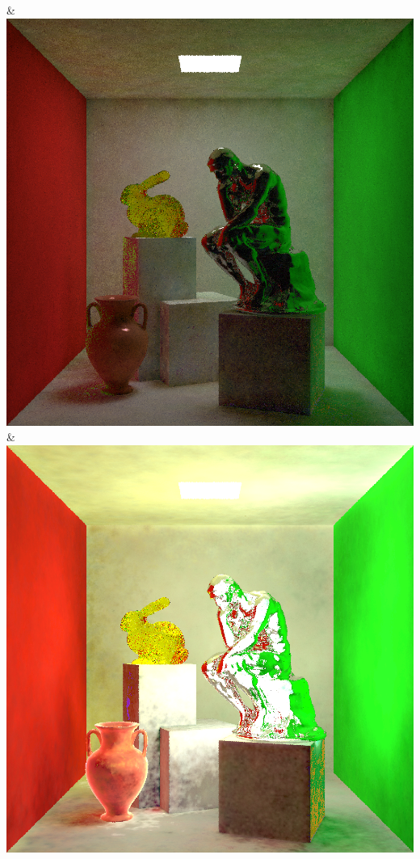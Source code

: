 & \includegraphics[width=\linewidth]{figures/py/tests/quality_comparison/nrc+bt_1spp_thinker.png}
& \includegraphics[width=\linewidth]{figures/py/tests/quality_comparison/nrc+lt_1spp_thinker.png}
